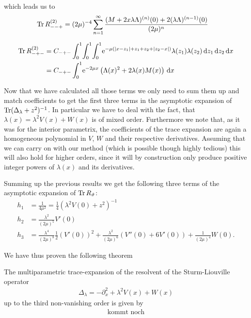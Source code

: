 which leads us to
\begin{align*}
  \Tr R_{--+}^{(2)}
  &= (2\mu)^{-4} \sum_{n=1}^{\infty}
  \frac{
    (M + 2x\lambda\Lambda)^{(n)}(0)
    + 2(\lambda\Lambda)^{(n-1)}(0)
  }{(2\mu)^n}
\end{align*}

\begin{align*}
  \Tr R_{-+-}^{(2)} &= C_{-+-} \Int{x}{
    \Int{z_2}{
      \Int{z_1}{
        \Eto{-\mu(\Abs{x-z_1}+z_1+z_2+\Abs{z_2-x})}\lambda(z_1)\lambda(z_2)
      }
    }
  } \\
  &= C_{-+-} \Int{x}{
    \Eto{-2\mu x}
    \left(
      \Lambda(x)^2 + 2\lambda(x)M(x)
    \right)
  }
\end{align*}

Now that we have calculated all those terms we only need to sum them up and
match coefficients to get the first three terms in the asymptotic expansion of
$\Tr(\Delta_\lambda + z^2)^{-1}$. In particular we have to deal with the fact,
that $\lambda(x) = \lambda^2 V(x) + W(x)$ is of mixed order. Furthermore we note
that, as it was for the interior parametrix, the coefficients of the trace
expansion are again a homogeneous polynomial in $V$, $W$ and their respective
derivatives. Assuming that we can carry on with our method (which is possible
though highly tedious) this will also hold for higher orders, since it will by
construction only produce positive integer powers of $\lambda(x)$ and its
derivatives.

Summing up the previous results we get the following three terms of the
asymptotic expansion of $\Tr R_\theta$:
\begin{align}
  h_1 &= \frac{1}{4\mu^2} = \frac{1}{4} (\lambda^2V(0) + z^2)^{-1} \\
  h_2 &= \frac{\lambda^2}{(2\mu)^5} V'(0) \\
  h_3 &= \frac{\lambda^4}{(2\mu)^8} \frac12 (V'(0))^{2}
       + \frac{\lambda^2}{(2\mu)^6} \left(V''(0) + 6V'(0)\right)
       + \frac1{(2\mu)^4} W(0).
\end{align}

We have thus proven the following theorem
\begin{MainTheorem}
  The multiparametric trace-expansion of the resolvent of the Sturm-Liouville
  operator
  \begin{align*}
    \Delta_\lambda = -\partial_x^2 + \lambda^2 V(x) + W(x)
  \end{align*}
  up to the third non-vanishing order is given by
  \begin{align*}
    \text{kommt noch}
  \end{align*}
\end{MainTheorem}
